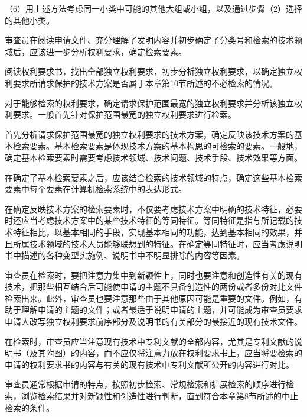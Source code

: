 {\setlength{\parindent}{17.1bp}（6）用上述方法考虑同一小类中可能的其他大组或小组，以及通过步骤（2）选择的其他小类。\par}

审查员在阅读申请文件、充分理解了发明内容并初步确定了分类号和检索的技术领域后，应该进一步分析权利要求，确定检索要素。

阅读权利要求书，找出全部独立权利要求，初步分析独立权利要求，以确定独立权利要求所请求保护的技术方案是否属于本章第10节所述的不必检索的情况。

对于能够检索的权利要求，确定请求保护范围最宽的独立权利要求并分析该独立权利要求。一般首先针对保护范围最宽的独立权利要求进行检索。

首先分析请求保护范围最宽的独立权利要求的技术方案，确定反映该技术方案的基本检索要素。基本检索要素是体现技术方案的基本构思的可检索的要素。一般地，确定基本检索要素时需要考虑技术领域、技术问题、技术手段、技术效果等方面。

在确定了基本检索要素之后，应该结合检索的技术领域的特点，确定这些基本检索要素中每个要素在计算机检索系统中的表达形式。

在确定反映技术方案的检索要素时，不仅要考虑技术方案中明确的技术特征，必要时还应当考虑技术方案中的某些技术特征的等同特征。等同特征是指与所记载的技术特征相比，以基本相同的手段，实现基本相同的功能，达到基本相同的效果，并且所属技术领域的技术人员能够联想到的特征。在确定等同特征时，应当考虑说明书中描述的各种变型实施例、说明书中不明显排除的内容等因素。

审查员在检索时，要把注意力集中到新颖性上，同时也要注意和创造性有关的现有技术，把那些相互结合后可能使申请的主题不具备创造性的两份或者多份对比文件检索出来。此外，审查员也要注意那些由于其他原因可能是重要的文件。例如，有助于理解申请的主题的文件；或者最适于说明申请的主题，并可能成为审查员要求申请人改写独立权利要求前序部分及说明书的有关部分的最接近的现有技术文件。

在检索时，审查员应当注意现有技术中专利文献的全部内容，尤其是专利文献的说明书（及其附图）的内容，而不应仅将注意力放在权利要求书上，应当将要检索的申请的权利要求书的内容与有关的现有技术中专利文献所公开的内容进行对比。

审查员通常根据申请的特点，按照初步检索、常规检索和扩展检索的顺序进行检索，浏览检索结果并对新颖性和创造性进行判断，直到符合本章第8节所述的中止检索的条件。

